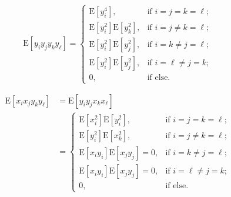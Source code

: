\documentclass[journal]{IEEEtran}
\begin{document}
\begin{equation}
\mathrm{E}\left[y_{i} y_{j} y_{k} y_{\ell}\right] = \begin{cases}
\mathrm{E}\left[y_{i}^{4}\right], & \text{if } i=j=k=\ell; \\
\mathrm{E}\left[y_{i}^{2}\right] \mathrm{E}\left[y_{k}^{2}\right], & \text{if } i=j \neq k=\ell; \\
\mathrm{E}\left[y_{i}^{2}\right] \mathrm{E}\left[y_{j}^{2}\right], &  \text{if } i=k \neq j=\ell; \\
\mathrm{E}\left[y_{i}^{2}\right] \mathrm{E}\left[y_{j}^{2}\right], &  \text{if } i=\ell \neq j=k; \\
0, & \text{if } \text {else}.
\label{eqA8}
\end{cases}
\end{equation}

\begin{align}
\mathrm{E}\left[x_{i} x_{j} y_{k} y_{\ell}\right] & = \mathrm{E}\left[y_{i} y_{j} x_{k} x_{\ell}\right] \nonumber\\
& = \begin{cases}
\mathrm{E}\left[x_{i}^{2}\right] \mathrm{E}\left[y_{i}^{2}\right], & \text{if } i=j=k=\ell; \\
\mathrm{E}\left[y_{i}^{2}\right] \mathrm{E}\left[x_{k}^{2}\right], & \text{if } i=j \neq k=\ell; \\
\mathrm{E}\left[x_{i}y_{i}\right] \mathrm{E}\left[x_{j}y_{j}\right] = 0, &  \text{if } i=k \neq j=\ell; \\
\mathrm{E}\left[x_{i}y_{i}\right] \mathrm{E}\left[x_{j}y_{j}\right] = 0, &  \text{if } i=\ell \neq j=k; \\
0, & \text{if } \text {else}.
\label{eqA9}
\end{cases}
\end{align}
\end{document}
